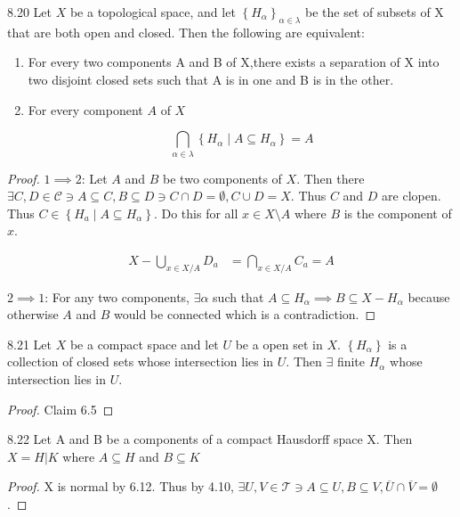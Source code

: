 \documentclass{article}
\newcommand*{\T}{\mathcal{T}}
\newcommand*{\subeq}{\subseteq}
\newcommand*{\empset}{\emptyset}
\begin{document}
\bigskip

\begin{claim}{8.20}\label{Claim 8.20.}
    Let $X$ be a topological space, and let $\left\{ H_\alpha \right\}_{\alpha \in \lambda}$  be the set of subsets of X that are both open and closed. Then the following are equivalent:

    \begin{enumerate}
        \item For every two components A and B of X,there exists a separation of X into two disjoint closed sets such that A is in one and B is in the other.
        \item For every component $A$ of $X$
        
        \[
        \bigcap_{\alpha \in \lambda} \left\{ H_\alpha \mid A \subeq H_\alpha \right\} = A
        \] 
    \end{enumerate}
    
\end{claim}
\begin{proof}
    $1 \implies 2$: Let $A$ and $B$ be two components of $X$. Then there $\exists C, D \in \mathcal{C} \ni A \subeq C, B \subeq D \ni C \cap D = \empset, C \cup D = X$. Thus $C$ and $D$ are clopen. Thus $C \in \left\{ H_a \mid A \subeq H_\alpha \right\}$. Do this for all $x \in X \setminus A$ where $B$ is the component of $x$. 
    
    \begin{align*}
        X - \bigcup_{x \in X / A} D_a &= \bigcap_{x \in X / A} C_a = A
    \end{align*}

    $2 \implies 1$: For any two components, $\exists \alpha$ such that $A \subeq H_\alpha \implies B \subeq X - H_\alpha$ because otherwise $A$ and $B$ would be connected which is a contradiction.    
\end{proof}

\bigskip

\begin{claim}{8.21}\label{Claim 8.21.}
    Let $X$ be a compact space and let $U$ be a open set in $X$. $\left\{ H_\alpha \right\}$ is a collection of closed sets whose intersection lies in $U$. Then $\exists$ finite $H_\alpha$ whose intersection lies in $U$.         
\end{claim}
\begin{proof}
    Claim 6.5
\end{proof}

\bigskip

\begin{claim}{8.22}\label{Claim 8.22.}
    Let A and B be a components of a compact Hausdorff space X. Then $X = H | K$ where $A \subeq H$ and $B \subeq K$    
\end{claim}
\begin{proof}
    X is normal by 6.12. Thus by 4.10, $\exists U, V \in \T \ni A \subeq U, B \subeq V, \overline{U} \cap \overline{V} = \empset$.   
\end{proof}
\end{document}

